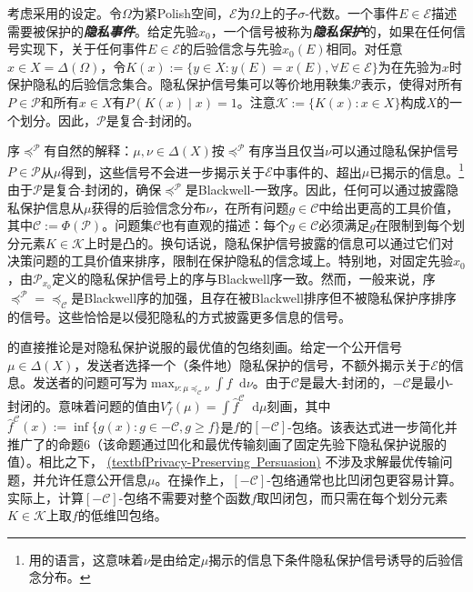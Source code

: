 \documentclass[12pt,letterpaper]{article}
\newenvironment{translation}{\color{blue}}{}
\theoremstyle{plain}
\theoremstyle{definition}
\theoremstyle{remark}
\newcommand{\Pc}{\mathcal{P}}
\newcommand{\C}{\mathcal{C}}
\renewcommand*\d{\mathop{}\!\mathrm{d}}
\theoremstyle{definition}
\DeclareRobustCommand{\weqref}[2]{
  \leavevmode\nobreak\hbox{\hyperlink{#2}{\textup{(#1)}}}
}
\begin{document}
\begin{translation}
考虑\citet{strack2024privacy}采用的设定。令$\Omega$为紧Polish空间，$\mathcal{E}$为$\Omega$上的子$\sigma$-代数。一个事件$E \in \mathcal{E}$描述需要被保护的\textit{\textbf{隐私事件}}。给定先验$x_0$，一个信号被称为\textit{\textbf{隐私保护}}的，如果在任何信号实现下，关于任何事件$E \in \mathcal{E}$的后验信念与先验$x_0(E)$相同。对任意$x \in X=\Delta(\Omega)$，令$K(x):=\{y \in X: y(E)=x(E), \forall E \in \mathcal{E}\}$为在先验为$x$时保护隐私的后验信念集合。隐私保护信号集可以等价地用鞅集$\Pc$表示，使得对所有$P \in \Pc$和所有$x \in X$有$P(K(x)\mid x)=1$。注意$\mathcal{K}:=\{K(x): x \in X\}$构成$X$的一个划分。因此，$\Pc$是复合-封闭的。

序$\preceq^{\Pc}$有自然的解释：$\mu,\nu \in \Delta(X)$按$\preceq^{\Pc}$有序当且仅当$\nu$可以通过隐私保护信号$P \in \Pc$从$\mu$得到，这些信号不会进一步揭示关于$\mathcal{E}$中事件的、超出$\mu$已揭示的信息。\footnote{用\citet{strack2024privacy}的语言，这意味着$\nu$是由给定$\mu$揭示的信息下条件隐私保护信号诱导的后验信念分布。}由于$\Pc$是复合-封闭的，确保$\preceq^{\Pc}$是Blackwell-一致序。因此，任何可以通过披露隐私保护信息从$\mu$获得的后验信念分布$\nu$，在所有问题$g \in \C$中给出更高的工具价值，其中$\C:=\Phi(\Pc)$。问题集$\C$也有直观的描述：每个$g \in \C$必须满足$g$在限制到每个划分元素$K \in \mathcal{K}$上时是凸的。换句话说，隐私保护信号披露的信息可以通过它们对决策问题的工具价值来排序，限制在保护隐私的信念域上。特别地，对固定先验$x_0$，由$\Pc_{x_0}$定义的隐私保护信号上的序与Blackwell序一致。然而，一般来说，序$\preceq^{\Pc}=\preceq_{\C}$是Blackwell序的加强，且存在被Blackwell排序但不被隐私保护序排序的信号。这些恰恰是以侵犯隐私的方式披露更多信息的信号。

的直接推论是对隐私保护说服的最优值的包络刻画。给定一个公开信号$\mu \in \Delta(X)$，发送者选择一个（条件地）隐私保护的信号，不额外揭示关于$\mathcal{E}$的信息。发送者的问题可写为$\max_{\nu: \mu \preceq_{\C} \nu} \int f \d \nu$。由于$\C$是最大-封闭的，$-\C$是最小-封闭的。意味着问题的值由$V^\star_f(\mu)=\int \widehat{f}^{\C} \d \mu$刻画，其中$\widehat{f}^{\C}(x):=\inf\{g(x):g \in -\C, g \geq f\}$是$f$的$[-\C]$-包络。该表达式进一步简化并推广了\citet{strack2024privacy}的命题6（该命题通过凹化和最优传输刻画了固定先验下隐私保护说服的值）。相比之下，\weqref{textbf{Privacy-Preserving Persuasion}}{eq:privacy}不涉及求解最优传输问题，并允许任意公开信息$\mu$。在操作上，$[-\C]$-包络通常也比凹闭包更容易计算。实际上，计算$[-\C]$-包络不需要对整个函数$f$取凹闭包，而只需在每个划分元素$K \in \mathcal{K}$上取$f$的低维凹包络。


\end{translation}
\end{document}

